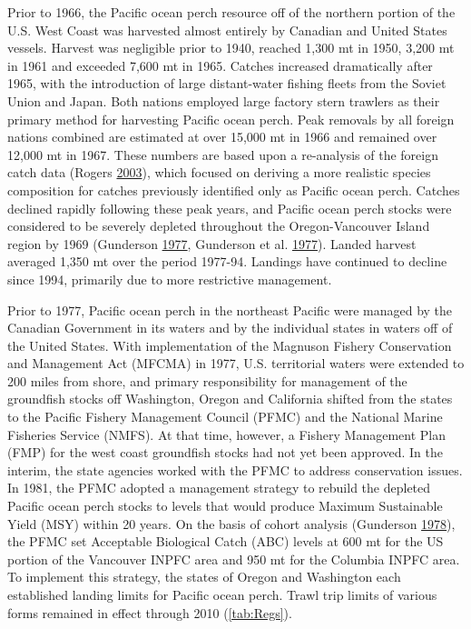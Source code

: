 \documentclass[12pt,]{article}
\begin{document}
Prior to 1966, the Pacific ocean perch resource off of the northern
portion of the U.S. West Coast was harvested almost entirely by Canadian
and United States vessels. Harvest was negligible prior to 1940, reached
1,300 mt in 1950, 3,200 mt in 1961 and exceeded 7,600 mt in 1965.
Catches increased dramatically after 1965, with the introduction of
large distant-water fishing fleets from the Soviet Union and Japan. Both
nations employed large factory stern trawlers as their primary method
for harvesting Pacific ocean perch. Peak removals by all foreign nations
combined are estimated at over 15,000 mt in 1966 and remained over
12,000 mt in 1967. These numbers are based upon a re-analysis of the
foreign catch data (Rogers
\protect\hyperlink{ref-rogers_species_2003}{2003}), which focused on
deriving a more realistic species composition for catches previously
identified only as Pacific ocean perch. Catches declined rapidly
following these peak years, and Pacific ocean perch stocks were
considered to be severely depleted throughout the Oregon-Vancouver
Island region by 1969 (Gunderson
\protect\hyperlink{ref-gunderson_population_1977}{1977}, Gunderson et
al. \protect\hyperlink{ref-gunderson_status_1977}{1977}). Landed harvest
averaged 1,350 mt over the period 1977-94. Landings have continued to
decline since 1994, primarily due to more restrictive management.

Prior to 1977, Pacific ocean perch in the northeast Pacific were managed
by the Canadian Government in its waters and by the individual states in
waters off of the United States. With implementation of the Magnuson
Fishery Conservation and Management Act (MFCMA) in 1977, U.S.
territorial waters were extended to 200 miles from shore, and primary
responsibility for management of the groundfish stocks off Washington,
Oregon and California shifted from the states to the Pacific Fishery
Management Council (PFMC) and the National Marine Fisheries Service
(NMFS). At that time, however, a Fishery Management Plan (FMP) for the
west coast groundfish stocks had not yet been approved. In the interim,
the state agencies worked with the PFMC to address conservation issues.
In 1981, the PFMC adopted a management strategy to rebuild the depleted
Pacific ocean perch stocks to levels that would produce Maximum
Sustainable Yield (MSY) within 20 years. On the basis of cohort analysis
(Gunderson \protect\hyperlink{ref-gunderson_results_1978}{1978}), the
PFMC set Acceptable Biological Catch (ABC) levels at 600 mt for the US
portion of the Vancouver INPFC area and 950 mt for the Columbia INPFC
area. To implement this strategy, the states of Oregon and Washington
each established landing limits for Pacific ocean perch. Trawl trip
limits of various forms remained in effect through 2010
(\ref{tab:Regs}).
\end{document}
